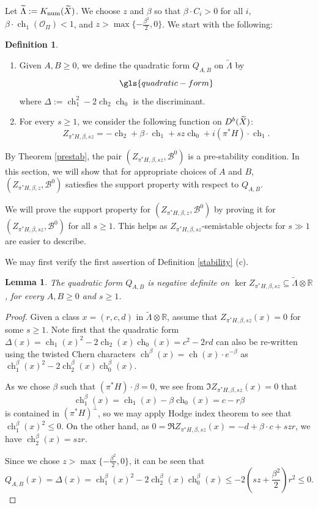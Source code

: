 \documentclass[12pt]{amsart}
\newtheorem{lemma}[theorem]{Lemma}
\theoremstyle{definition}
\newtheorem{definition}[theorem]{Definition}
\DeclareMathOperator{\num}{num}
\DeclareMathOperator{\ch}{ch}
\begin{document}
Let $\widetilde{\Lambda} := {\rm K}_{\num}(\widetilde{X})$.
We choose $z$ and $\beta$ so that $\beta \cdot C_i>0$ for all $i$, 
$\beta \cdot \ch_1(\mathcal{O}_{\Pi}) <1$, and $z> \max\{-\frac{\beta^2}{2},0\}$. We start with the following:
\begin{definition}
\begin{enumerate}
\item Given $A,B \geq 0$, we define  the quadratic form $Q_{A,B}$ on $\widetilde{\Lambda}$ by
\begin{equation}
\label{eqn:QAB}
\gls{quadratic-form}
\end{equation} 
where $\Delta:=  \ch_1^2-2\ch_2\ch_0$ is the discriminant.
\item For every $s \geq 1$, we consider the following function on ${\rm D}^b(\widetilde{X})$:
$$Z_{\pi^\ast H,\beta,sz} = -\ch_2+\beta \cdot \ch_1+sz\ch_0+i(\pi^\ast H)\cdot \ch_1.$$
\end{enumerate}
\end{definition}
By Theorem \ref{prestab}, the pair $(Z_{\pi^\ast H,\beta,sz},\mathcal{B}^0)$ is a pre-stability condition.
In this section, we will show that for appropriate choices of $A$ and $B$, 
$(Z_{\pi^\ast H,\beta,z},\mathcal{B}^0)$ satiesfies the support property with respect to $Q_{A,B}.$

We will prove the support property for $(Z_{\pi^\ast H,\beta,z},\mathcal{B}^0)$ by proving it for $(Z_{\pi^\ast H,\beta,sz},\mathcal{B}^0)$ for all $s \geq 1$.
This helps as $Z_{\pi^\ast H,\beta,sz}$-semistable objects for $s \gg 1$ are easier to describe.

We may first verify the first assertion of Definition \ref{stability} (c).

\begin{lemma}\label{negdef}
The quadratic form $Q_{A,B}$ is negative definite on $\ker Z_{\pi^\ast H,\beta,sz} \subseteq \widetilde{\Lambda} \otimes \mathbb{R}$, for every $A,B \geq 0$ and $s \geq 1$.
\end{lemma}
\begin{proof}
Given a class $x=(r,c,d)$ in $\widetilde{\Lambda} \otimes \mathbb{R}$,
assume that $Z_{\pi^\ast H,\beta,sz}(x)=0$ for some $s\geq 1$.
Note first that the quadratic form $\Delta(x) = \ch_1(x)^2-2\ch_2(x)\ch_0(x)=c^2-2rd$ can also be re-written using the twisted Chern characters $\ch^\beta(x)=\ch(x) \cdot e^{-\beta}$ as $\ch^\beta_1(x)^2-2\ch^\beta_2(x)\ch^\beta_0(x)$.

As we chose $\beta$ such that $(\pi^\ast H)\cdot \beta = 0$, we see from $\Im Z_{\pi^\ast H,\beta,sz}(x)=0$ that 
\[\ch^\beta_1(x) = \ch_1(x) - \beta \ch_0(x)=c - r \beta\] is contained in $(\pi^\ast H)^\perp$, 
so we may apply Hodge index theorem to see that $\ch^\beta_1(x)^2 \leq 0$.
On the other hand, as $0 = \Re Z_{\pi^\ast H,\beta,sz}(x)= -d+\beta \cdot c+szr$, we have $\ch^\beta_2(x)=szr$.

Since we chose $z>\max\{-\frac{\beta^2}{2},0\}$,
it can be seen that 
$$Q_{A,B}(x)= \Delta(x)=\ch^\beta_1(x)^2-2\ch^\beta_2(x)\ch^\beta_0(x) \leq -2(sz+\frac{\beta^2}{2})r^2 \leq 0.$$   
\end{proof}
\end{document}
